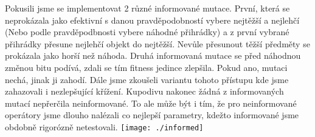 \documentclass[a4paper]{article}
\newenvironment{ukol}[2][]{\begin{trivlist} 
\item[\hskip \labelsep {\bfseries #1}\hskip \labelsep {\bfseries #2}]}{\end{trivlist}}
\begin{document}
\begin{ukol}{Informovaná mutace}

	Pokusili jsme se implementovat 2 různé informované mutace. První, která se neprokázala jako efektivní s danou pravděpodobností vybere nejtěžší a nejlehčí 
	(Nebo podle pravděpodbnosti vybere náhodné přihrádky) a z první vybrané přihrádky přesune nejlehčí objekt do nejtěžší. Nevůle přesunout těžší předměty
	se prokázala jako horší než náhoda. Druhá informovaná mutace se před náhodnou změnou bitu podívá, zdali se tím fitness jedince zlepšila. Pokud ano, mutaci 
	nechá, jinak ji zahodí. Dále jsme zkoušeli variantu tohoto přístupu kde jsme zahazovali i nezlepšující křížení. Kupodivu nakonec žádná z informovaných
	mutací nepřerčila neinformované. To ale může být i tím, že pro neinformované operátory jsme dlouho nalézali co nejlepší parametry, kdežto informované
	jsme obdobně rigorózně netestovali.
	\texttt{[image: ./informed]}
\end{ukol}
\end{document}
